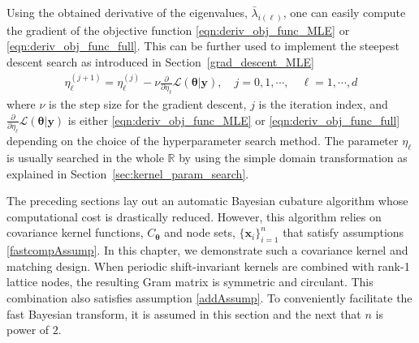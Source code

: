 \documentclass{iitthesis}          %
\newcommand{\bm}[1]{\boldsymbol{#1}}
\newcommand{\reals}{\mathbb{R}}
\newcommand{\vtheta}{{\bm{\theta}}}
\newcommand{\vx}{\bm{x}}
\newcommand{\vy}{\bm{y}}
\newcommand\secref{Section~\ref}
\begin{document}
Using the obtained derivative of the eigenvalues, $\bar{\lambda}_{i(\ell)}$, one can easily compute the gradient of the objective function \eqref{eqn:deriv_obj_func_MLE} or \eqref{eqn:deriv_obj_func_full}. This can be further used to implement the steepest descent search as introduced in \secref{grad_descent_MLE} 
\begin{align*}
\eta^{(j+1)}_\ell = \eta^{(j)}_\ell - \nu \frac{\partial}{\partial \eta_\ell} \mathcal{L}(\vtheta | \vy), \quad j=0,1,\cdots,  \quad \ell = 1, \cdots, d
\end{align*}
where $\nu$ is the step size for the gradient descent, $j$ is the iteration index, and $\frac{\partial}{\partial \eta_\ell} \mathcal{L}(\vtheta | \vy)$ is either \eqref{eqn:deriv_obj_func_MLE} or \eqref{eqn:deriv_obj_func_full} depending on the choice of the hyperparameter search method. The parameter $\eta_\ell$ is usually searched in the whole $\reals$ by using the simple domain transformation as explained in Section~\ref{sec:kernel_param_search}.












\label{sec:shift_invariant_kernel}

The preceding sections lay out an automatic Bayesian cubature algorithm whose computational cost is drastically reduced.  However, this algorithm relies on covariance kernel functions, $C_{\vtheta}$ and node sets, $\{\vx_i\}_{i=1}^n$ that satisfy assumptions \eqref{fastcompAssump}.  
In this chapter, we demonstrate such a covariance kernel and matching design.
When periodic shift-invariant kernels are combined with rank-1 lattice nodes, the resulting Gram matrix is symmetric and circulant. 
This combination also satisfies assumption \eqref{addAssump}.  To conveniently facilitate the fast Bayesian transform, it is assumed in this section and the next that $n$ is power of $2$.  
\end{document}
